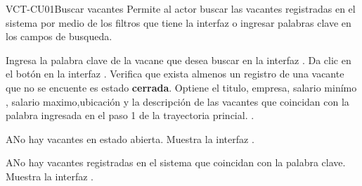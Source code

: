 \begin{UseCase}[]{VCT-CU01}{Buscar vacantes}{
	Permite al actor buscar las vacantes registradas en el sistema por medio de los filtros que tiene la interfaz o
	ingresar palabras clave en los campos de busqueda.
	}
\end{UseCase}

\begin{UCtrayectoria}
	\UCpaso [\UCactor] Ingresa la palabra clave de la vacane que desea buscar en la interfaz .
	\UCpaso [\UCactor] Da clic en el botón  en la interfaz .
    \UCpaso [\UCsist] Verifica que exista almenos un registro de una vacante que no se encuente es estado \textbf{cerrada}.
	\UCpaso [\UCsist] Optiene el titulo, empresa, salario minímo
	, salario maximo,ubicación y la descripción  de las vacantes que coincidan con 
	la palabra ingresada en el paso 1 de la trayectoria princial. 
	.
\end{UCtrayectoria}

\begin{UCtrayectoriaA}{A}{No hay vacantes en estado abierta.}
	\UCpaso [\UCsist] Muestra la interfaz .
\end{UCtrayectoriaA}

\begin{UCtrayectoriaA}{A}{No hay vacantes registradas en el sistema que coincidan con la palabra clave.}
	\UCpaso [\UCsist] Muestra la interfaz .
\end{UCtrayectoriaA}
